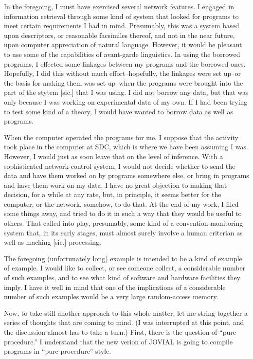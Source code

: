 \documentclass{article}
\begin{document}
In the foregoing, I must have exercised several network features. I engaged in information retrieval through some kind of system that looked for programs to meet certain requirements I had in mind. Presumably, this was a system based upon descriptors, or reasonable facsimiles thereof, and not in the near future, upon computer appreciation of natural language. However, it would be pleasant to use some of the capabilities of avant-garde linguistics. In using the borrowed programs, I effected some linkages between my programs and the borrowed ones. Hopefully, I did this without much effort--hopefully, the linkages were set up--or the basis for making them was set up--when the programs were brought into the part of the stytem [sic.] that I was using. I did not borrow any data, but that was only because I was working on experimental data of my own. If I had been trying to test some kind of a theory, I would have wanted to borrow data as well as programs.

When the computer operated the programs for me, I suppose that the activity took place in the computer at SDC, which is where we have been assuming I was. However, I would just as soon leave that on the level of inference. With a sophisticated network-control system, I would not decide whether to send the data and have them worked on by programs somewhere else, or bring in programs and have them work on my data. I have no great objection to making that decision, for a while at any rate, but, in principle, it seems better for the computer, or the network, somehow, to do that. At the end of my work, I filed some things away, and tried to do it in such a way that they would be useful to others. That called into play, presumably, some kind of a convention-monitoring system that, in its early stages, must almost surely involve a human criterian as well as maching [sic.] processing.

The foregoing (unfortunately long) example is intended to be a kind of example of example. I would like to collect, or see someone collect, a considerable number of such examples, and to see what kind of software and hardware facilities they imply. I have it well in mind that one of the implications of a considerable number of such examples would be a very large random-access memory.

Now, to take still another approach to this whole matter, let me string-together a series of thoughts that are coming to mind. (I was interrupted at this point, and the discussion almost has to take a turn.) First, there is the question of ``pure procedure.'' I understand that the new verion of JOVIAL is going to compile programs in ``pure-procedure'' style.
\end{document}

